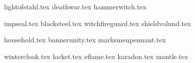
\raggedcolumns

\begin{multicols}{2}

\subtitle{\weaponenchantments}
\startsortedpricelist
{lightofstahl.tex}
{deathwar.tex}
{hammerwitch.tex}
\endsortedpricelist

\subtitle{\armourenchantments}
\startsortedpricelist
{impseal.tex}
{blacksteel.tex}
{witchfireguard.tex}
{shieldvolund.tex}
\endsortedpricelist

\subtitle{\bannerenchantments}
\startsortedpricelist
{household.tex}
{bannerunity.tex}
{marksmenpennant.tex}
\endsortedpricelist

\subtitle{\artefacts}
\startsortedpricelist
{wintercloak.tex}
{locket.tex}
{eflame.tex}
{karadon.tex}
{mantle.tex}
\endsortedpricelist

\end{multicols}
